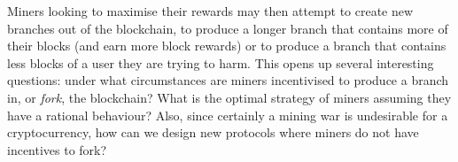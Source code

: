 Miners looking to maximise their rewards may then attempt to create new branches out of the blockchain, to produce a longer branch that contains more of their blocks (and earn more block rewards) or to produce a branch that contains less blocks of a user they are trying to harm. This opens up several interesting questions: under what circumstances are miners 
incentivised to produce a branch in, or \emph{fork}, the blockchain? What is the optimal strategy of miners assuming they have a rational behaviour? Also, since certainly a mining war is undesirable for a cryptocurrency, how can we design new protocols where miners do not have incentives to fork? 




